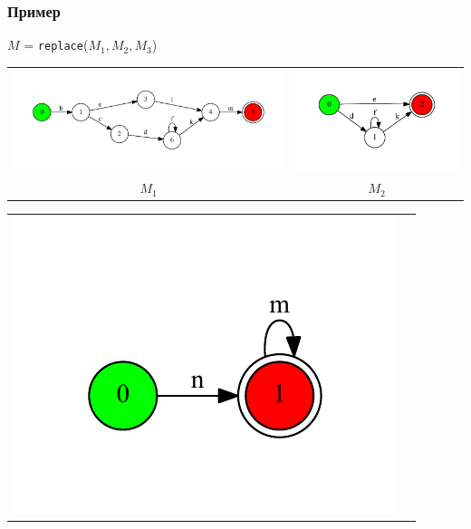 \documentclass{beamer}
\begin{document}
\begin{frame}[fragile]
\transwipe[direction=90]
\frametitle{Пример}
$M$ = \verb|replace|($M_1, M_2, M_3$)

\begin{tabular}{c c}        
     \begin{minipage}{.6\textwidth} 
     \includegraphics[width=\linewidth]{fsa1}
     \end{minipage} 
     &
     \begin{minipage}{.3\textwidth} 
     \includegraphics[width=\linewidth]{fsa2}
     \end{minipage} \\
     $M_1$ & $M_2$ \\
     \end{tabular}
     \begin{tabular}{c c}   
     \begin{minipage}{.25\textwidth} 
     \includegraphics[width=\linewidth]{fsa3}

\end{minipage}
\end{tabular}
\end{frame}
\end{document}
